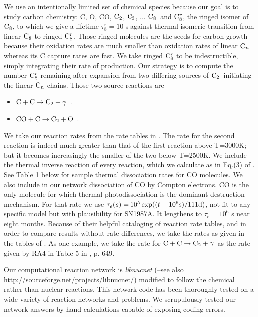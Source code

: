 \documentclass[manuscript]{aastex}
\newcommand{\ctwo}{{\rm C}_2}
\newcommand{\cthree}{{\rm C}_3}
\newcommand{\ceight}{{\rm C}_8}
\newcommand{\ceightr}{{\rm C}_8^r}
\newcommand{\cenn}{{\rm C}_n}
\newcommand{\twoctoctwo}{${\rm C} + {\rm C} \to \ctwo + \gamma$}
\newcommand{\coctoctwo}{${\rm CO} + {\rm C} \to \ctwo + {\rm O}$}
\begin{document}
We use an intentionally limited set of chemical species because our goal is
to study carbon chemistry: C, O, CO, $\ctwo$, $\cthree$, ... $\ceight$\ and
$\ceightr$, the ringed isomer of $\ceight$, to which we give a lifetime
$\tau_8^r = 10$ s against thermal isomeric transition
from linear $\ceight$ to ringed $\ceightr$.
Those ringed molecules are the seeds for carbon
growth because their oxidation rates are much smaller than oxidation rates of
linear $\cenn$
whereas its C capture rates are fast. We take ringed $\ceightr$ to be
indestructible, simply integrating their rate of production. Our strategy is
to compute the number $\ceightr$ remaining after expansion from two differing
sources of $\ctwo$\ initiating the linear $\cenn$
chains. Those two source reactions are
\begin{itemize}
\item \twoctoctwo\ \citep{1999Sci...283.1290C}.
\item \coctoctwo\ \citep{2009ApJ...703..642C,2010ApJ...713....1C}.
\end{itemize}
We take our reaction rates from the rate tables in
\citet{2009ApJ...703..642C,2010ApJ...713....1C}.
The rate for the second reaction is indeed
much greater than that of the first reaction above T=3000K;
but it becomes increasingly the smaller of the two below T=2500K.
We include the thermal inverse reaction of every reaction,
which we calculate as in Eq.(3) of \citet{2001ApJ...562..480C}.
See Table 1 below for sample thermal dissociation rates for CO molecules.
We also include in our network dissociation of CO by Compton electrons.
CO is the only molecule for which thermal photodissociation is the dominant
destruction mechanism. For that rate we use
$\tau_e (s) = 10^5 \exp( (t-10^6{\rm s}) / 111 {\rm d} )$,
not fit to any specific model but with plausibility for SN1987A.
It lengthens to $\tau_e = 10^6$ s near eight months.
Because of their helpful cataloging of reaction rate tables,
and in order to compare results without rate differences, we take the
rates as given in the tables of
\citet{2009ApJ...703..642C,2010ApJ...713....1C}.
As one example, we take the rate for \twoctoctwo\
as the rate given by RA4 in Table 5 in \citet{2009ApJ...703..642C}, p. 649.

Our computational reaction network is {\em libnucnet}
(\citealp{2007M&PSA..42.5215M}--see also
\url{http://sourceforge.net/projects/libnucnet/}) modified to follow
the chemical rather than nuclear reactions.
This network code has been thoroughly tested
on a wide variety of reaction networks and problems.
We scrupulously tested our network answers by hand calculations capable of
exposing coding errors.
\end{document}
